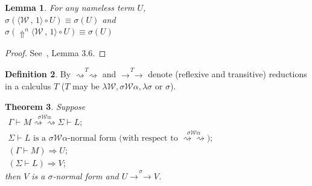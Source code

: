 \documentclass[11pt]{amsart}
\theoremstyle{plain}
\newtheorem{theorem}{Theorem}[section]
\newtheorem{lemma}[theorem]{Lemma}
\theoremstyle{definition}
\newtheorem{definition}[theorem]{Definition}
\theoremstyle{remark}
\numberwithin{equation}{section}
\newcommand{\ci}{\circ}
\newcommand{\ri}{\rightsquigarrow}
\newcommand{\mi}{\,,\,}
\newcommand{\arrow}{\rightarrow}
\newcommand{\la}{\langle}
\newcommand{\ra}{\rangle}
\newcommand{\twoh}{\arrow\arrow}
\renewcommand{\pi}{\mathcal{W}}
\begin{document}
\begin{lemma}\label{lemmauparrow}For any nameless term $U$,\\
 $\sigma(\la\pi\mi 1\ra\ci
U)\equiv\sigma(U)$ and\\
$\sigma(\Uparrow^n\!\la\pi\mi 1\ra\ci U)\equiv\sigma(U)$
\end{lemma}
\begin{proof}See~\cite{Abadi}, Lemma 3.6.
\end{proof}
\begin{definition}By $\overset{T}{\ri\ri}$ and
$\overset{T}{\twoh}$ denote (reflexive and transitive) reductions
in a calculus $T$ ($T$ may be
$\lambda\pi,\sigma\pi\alpha,\lambda\sigma$ or $\sigma$).
\end{definition}
\begin{theorem}\label{maintheorem}Suppose \\
$\begin{array}{l}
 \Gamma\vdash M\overset{\sigma\pi\alpha}{\ri\ri}\Sigma\vdash L;\\
 \Sigma\vdash L \text{ is a $\sigma\pi\alpha$-normal form (with respect to $\overset{\sigma\pi\alpha}{\ri\ri}$)};\\
 (\Gamma\vdash M) \boldsymbol{\Rightarrow}  U;\\
 (\Sigma\vdash L) \boldsymbol{\Rightarrow}  V;
\end{array}$\\[5pt]
then $V$ is  a $\sigma$-normal form and
$U\overset{\sigma}{\twoh}V$.
\end{theorem}
\end{document}
